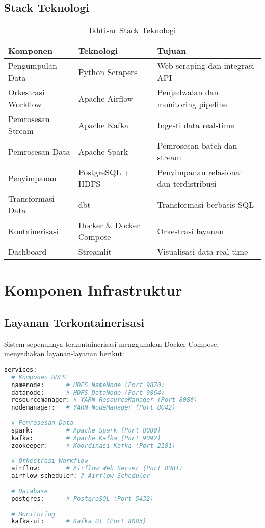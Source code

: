 \documentclass[12pt,a4paper]{article}
\begin{document}
\subsection{Stack Teknologi}

\begin{table}[H]
\centering
\begin{tabular}{|l|l|l|}
\hline
\textbf{Komponen} & \textbf{Teknologi} & \textbf{Tujuan} \\
\hline
Pengumpulan Data & Python Scrapers & Web scraping dan integrasi API \\
\hline
Orkestrasi Workflow & Apache Airflow & Penjadwalan dan monitoring pipeline \\
\hline
Pemrosesan Stream & Apache Kafka & Ingesti data real-time \\
\hline
Pemrosesan Data & Apache Spark & Pemrosesan batch dan stream \\
\hline
Penyimpanan & PostgreSQL + HDFS & Penyimpanan relasional dan terdistribusi \\
\hline
Transformasi Data & dbt & Transformasi berbasis SQL \\
\hline
Kontainerisasi & Docker \& Docker Compose & Orkestrasi layanan \\
\hline
Dashboard & Streamlit & Visualisasi data real-time \\
\hline
\end{tabular}
\caption{Ikhtisar Stack Teknologi}
\label{tab:tech-stack}
\end{table}

\section{Komponen Infrastruktur}

\subsection{Layanan Terkontainerisasi}
Sistem sepenuhnya terkontainerisasi menggunakan Docker Compose, menyediakan layanan-layanan berikut:

\begin{lstlisting}[language=bash, caption=Layanan Docker Compose]
services:
  # Komponen HDFS
  namenode:      # HDFS NameNode (Port 9870)
  datanode:      # HDFS DataNode (Port 9864)
  resourcemanager: # YARN ResourceManager (Port 8088)
  nodemanager:   # YARN NodeManager (Port 8042)
  
  # Pemrosesan Data
  spark:         # Apache Spark (Port 8080)
  kafka:         # Apache Kafka (Port 9092)
  zookeeper:     # Koordinasi Kafka (Port 2181)
  
  # Orkestrasi Workflow
  airflow:       # Airflow Web Server (Port 8081)
  airflow-scheduler: # Airflow Scheduler
  
  # Database
  postgres:      # PostgreSQL (Port 5432)
  
  # Monitoring
  kafka-ui:      # Kafka UI (Port 8083)
\end{lstlisting}
\end{document}
